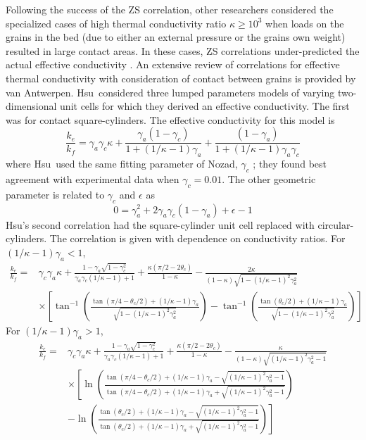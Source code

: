 Following the success of the ZS correlation, other researchers considered the specialized cases of high thermal conductivity ratio $\kappa \ge 10^3$ when loads on the grains in the bed (due to either an external pressure or the grains own weight) resulted in large contact areas. In these cases, ZS correlations under-predicted the actual effective conductivity \cite{Aichlmayr2005}. An extensive review of correlations for effective thermal conductivity with consideration of contact between grains is provided by van Antwerpen\etal \cite{VanAntwerpen2010}. Hsu\etal~considered three lumped parameters models of varying two-dimensional unit cells for which they derived an effective conductivity.\cite{Bay1995} The first was for contact square-cylinders. The effective conductivity for this model is
\begin{equation}
    \frac{k_e}{k_f} = \gamma_a\gamma_c\kappa + \frac{\gamma_a(1-\gamma_c)}{1+(1/\kappa-1)\gamma_a} + \frac{(1-\gamma_a)}{1+(1/\kappa-1)\gamma_a\gamma_c}
\end{equation}
where Hsu\etal~used the same fitting parameter of Nozad\etal, $\gamma_c$ \cite{Nozad1985}; they found best agreement with experimental data when $\gamma_c = 0.01$. The other geometric parameter is related to $\gamma_c$ and $\epsilon$ as
\begin{equation}
    0=\gamma_a^2 + 2\gamma_a\gamma_c(1-\gamma_a) + \epsilon - 1
\end{equation}
Hsu\etal's second correlation had the square-cylinder unit cell replaced with circular-cylinders. The correlation is given with dependence on conductivity ratios. For $(1/\kappa-1)\gamma_a < 1$,
\begin{equation}
\begin{split}
    \frac{k_e}{k_f} ={} &\gamma_c\gamma_a\kappa + \frac{1-\gamma_a\sqrt{1-\gamma_c^2}}{\gamma_a\gamma_c(1/\kappa-1)+1} + \frac{\kappa(\pi/2 - 2\theta_c)}{1-\kappa} - \frac{2\kappa}{(1-\kappa)\sqrt{1-(1/\kappa-1)^2\gamma_a^2}}\\
    &\times\left[\tan^{-1}\left(\frac{\tan(\pi/4 - \theta_c/2)+(1/\kappa-1)\gamma_a}{\sqrt{1-(1/\kappa-1)^2\gamma_a^2}} \right) - \tan^{-1}\left(\frac{\tan(\theta_c/2)+(1/\kappa-1)\gamma_a}{\sqrt{1-(1/\kappa-1)^2\gamma_a^2}}\right) \right]
\end{split}
\end{equation}
For $(1/\kappa-1)\gamma_a>1$,
\begin{equation}
\begin{split}
    \frac{k_e}{k_f} ={} &\gamma_c\gamma_a\kappa + \frac{1-\gamma_a\sqrt{1-\gamma_c^2}}{\gamma_a\gamma_c(1/\kappa-1)+1} + \frac{\kappa(\pi/2 - 2\theta_c)}{1-\kappa} - \frac{\kappa}{(1-\kappa)\sqrt{(1/\kappa-1)^2\gamma_a^2-1}}\\
    & \times\left[\ln\left(\frac{\tan(\pi/4 - \theta_c/2)+(1/\kappa-1)\gamma_a - \sqrt{(1/\kappa-1)^2\gamma_a^2-1}}{\tan(\pi/4-\theta_c/2) +(1/\kappa-1)\gamma_a+\sqrt{(1/\kappa-1)^2\gamma_a^2-1}} \right) \right.\\
    & -\left.\ln\left(\frac{\tan(\theta_c/2)+(1/\kappa-1)\gamma_a - \sqrt{(1/\kappa-1)^2\gamma_a^2-1}}{\tan(\theta_c/2) +(1/\kappa-1)\gamma_a+\sqrt{(1/\kappa-1)^2\gamma_a^2-1}} \right) \right]
\end{split}
\end{equation}
